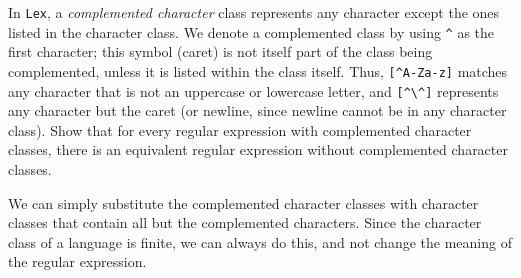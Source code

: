 \begin{exercise}\label{ex:030308}
    In \texttt{Lex}, a \emph{complemented character} class represents any 
    character except the ones listed in the character class. We denote a 
    complemented class by using \texttt{\^{}} as the first character; this 
    symbol (caret) is not itself part of the class being complemented, unless 
    it is listed within the class itself. Thus, \texttt{[\^{}A-Za-z]} matches 
    any character that is not an uppercase or lowercase letter, and 
    \texttt{[\^{}\textbackslash\^{}]} represents any character but the caret 
    (or newline, since newline cannot be in any character class). Show that for 
    every regular expression with complemented character classes, there is an 
    equivalent regular expression without complemented character classes.
\end{exercise}
\begin{solution}\label{sol:030308}
    We can simply substitute the complemented character classes with character
    classes that contain all but the complemented characters. Since the character
    class of a language is finite, we can always do this, and not change the 
    meaning of the regular expression.
\end{solution}